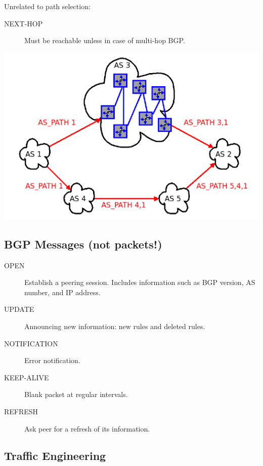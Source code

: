 \documentclass{article}
\begin{document}
Unrelated to path selection:

\begin{description}
	\item[NEXT-HOP] Must be reachable unless in case of multi-hop BGP.
\end{description}



\centerline{\includegraphics[scale=0.5]{images/AS_PATH.png}\\[1cm]}
	
	

\subsection{BGP Messages (not packets!)}	


\begin{description}
	\item[OPEN] Establish a peering session. Includes information such as BGP version, AS number, and IP address.
	\item[UPDATE] Announcing new information: new rules and deleted rules.
	\item[NOTIFICATION] Error notification.
	\item[KEEP-ALIVE] Blank packet at regular intervals.
	\item[REFRESH] Ask peer for a refresh of its information.
\end{description}


\subsection{Traffic Engineering}	
\end{document}
